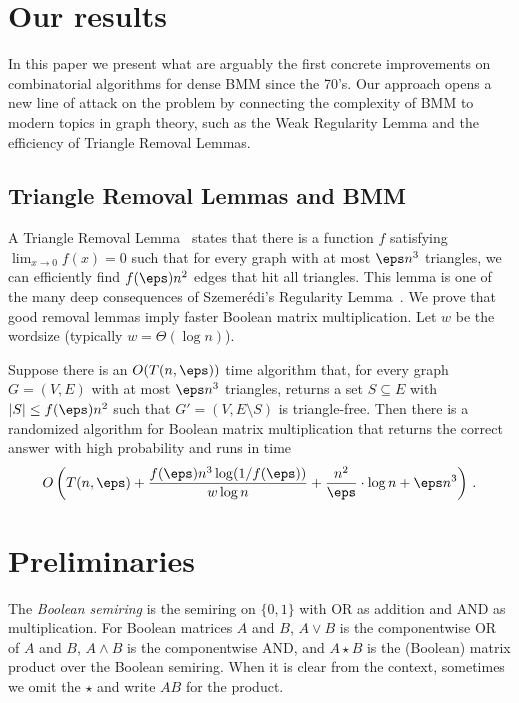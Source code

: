 \section{Our results}

In this paper we present what are arguably the first concrete improvements on combinatorial algorithms for dense BMM since the 70's. Our approach opens a new line of attack on the problem by connecting the complexity of BMM to modern topics in graph theory, such as the Weak Regularity Lemma and the efficiency of Triangle Removal Lemmas.

\subsection{Triangle Removal Lemmas and BMM}

A Triangle Removal Lemma~\cite{RuzsaSz,Green} states that there is a function $f$ satisfying $\lim_{x \rightarrow 0} f(x) = 0$ such that for every graph with at most $\eps n^3$ triangles, we can efficiently find $f(\eps) n^2$ edges that hit all triangles. This lemma is one of the many deep consequences of Szemer\'{e}di's Regularity Lemma~\cite{sz}. We prove that good removal lemmas imply faster Boolean matrix multiplication. Let $w$ be the wordsize (typically $w = \Theta(\log n)$).

\begin{theorem} \label{boolmmtriangles} Suppose there is an $O(T(n,\eps))$ time algorithm that, for every graph $G=(V,E)$ with at most $\eps n^3$ triangles, returns a set $S \subseteq E$ with $|S| \leq f(\eps) n^2$ such that $G'=(V,E\setminus S)$ is triangle-free. Then there is a randomized algorithm for Boolean matrix multiplication that returns the correct answer with high probability and runs in time
%
 \[
O\left(T(n,\eps) + \frac{f(\eps) n^3 \log (1/f(\eps))}{w \log n} + \frac{n^2}{\eps} \cdot \log n + \eps n^3\right)\,.
\]
%
\end{theorem}

\section{Preliminaries}
The \emph{Boolean semiring} is the semiring on $\{0,1\}$ with OR as addition and AND as multiplication. For Boolean matrices $A$ and $B$, $A \vee B$ is the componentwise OR of $A$ and $B$, $A \wedge B$ is the componentwise AND, and $A \star B$ is the (Boolean) matrix product over the Boolean semiring. When it is clear from the context, sometimes we omit the $\star$ and write $A B$ for the product.

